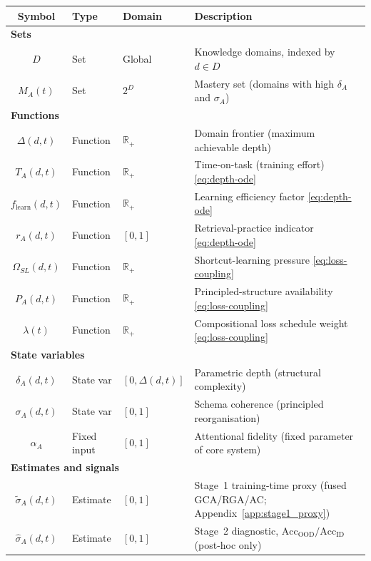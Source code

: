\documentclass{article}
\theoremstyle{definition}
\newcommand{\R}{\mathbb{R}}
\begin{document}
\begin{center}
\footnotesize
\setlength{\tabcolsep}{4pt}
\begin{tabular}{c l l >{\raggedright\arraybackslash}p{4.2cm}}
\toprule
\textbf{Symbol} & \textbf{Type} & \textbf{Domain} & \textbf{Description} \\
\midrule
\multicolumn{4}{l}{\textbf{Sets}} \\
$D$ & Set & Global & Knowledge domains, indexed by $d \in D$ \\
$M_A(t)$ & Set & $2^D$ & Mastery set (domains with high $\delta_A$ and $\sigma_A$) \\
\multicolumn{4}{l}{\textbf{Functions}} \\
$\Delta(d,t)$ & Function & $\R_+$ & Domain frontier (maximum achievable depth) \\
$T_A(d,t)$ & Function & $\R_+$ & Time-on-task (training effort) \hfill\eqref{eq:depth-ode} \\
$f_{\text{learn}}(d,t)$ & Function & $\R_+$ & Learning efficiency factor \hfill\eqref{eq:depth-ode} \\
$r_A(d,t)$ & Function & $[0,1]$ & Retrieval-practice indicator \hfill\eqref{eq:depth-ode} \\
$\Omega_{SL}(d,t)$ & Function & $\R_+$ & Shortcut-learning pressure \hfill\eqref{eq:loss-coupling} \\
$P_A(d,t)$ & Function & $\R_+$ & Principled-structure availability \hfill\eqref{eq:loss-coupling} \\
$\lambda(t)$ & Function & $\R_+$ & Compositional loss schedule weight \hfill\eqref{eq:loss-coupling} \\
\multicolumn{4}{l}{\textbf{State variables}} \\
$\delta_A(d,t)$ & State var & $[0, \Delta(d,t)]$ & Parametric depth (structural complexity) \\
$\sigma_A(d,t)$ & State var & $[0,1]$ & Schema coherence (principled reorganisation) \\
$\alpha_A$ & Fixed input & $[0,1]$ & Attentional fidelity (fixed parameter of core system) \\
\multicolumn{4}{l}{\textbf{Estimates and signals}} \\
$\tilde{\sigma}_A(d,t)$ & Estimate & $[0,1]$ & Stage~1 training-time proxy (fused GCA/RGA/AC; Appendix~\ref{app:stage1_proxy}) \\
$\hat{\sigma}_A(d,t)$ & Estimate & $[0,1]$ & Stage~2 diagnostic, $\text{Acc}_{\text{OOD}}/\text{Acc}_{\text{ID}}$ (post-hoc only) \\

\end{tabular}
\end{center}
\end{document}
